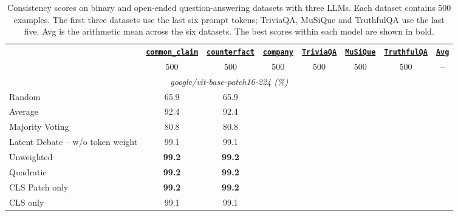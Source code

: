 \begin{table}[tp]
    \centering
    \tiny
    \setlength{\tabcolsep}{2.2mm}
    \begin{threeparttable}
        \begin{tabular}{lccccccc}
            \toprule
            & \textbf{\underline{\texttt{common\_claim}}} & \textbf{\underline{\texttt{counterfact}}} & \textbf{\underline{\texttt{company}}} & \textbf{\underline{\texttt{TriviaQA}}} & \textbf{\underline{\texttt{MuSiQue}}} & \textbf{\underline{\texttt{TruthfulQA}}} & \textbf{\underline{\texttt{Avg}}} \\
            & 500 & 500 & 500 & 500 & 500 & 500 & -- \\
            \midrule
            \multicolumn{8}{c}{\textit{google/vit-base-patch16-224 (\%)}} \\
            \midrule
            Random & 65.9 & 65.9 \\
            Average & 92.4 & 92.4 \\
            Majority Voting & 80.8 & 80.8 \\
            Latent Debate -- w/o token weight & 99.1 & 99.1 \\
            Unweighted & \textbf{99.2} & \textbf{99.2} \\
            Quadratic & \textbf{99.2} & \textbf{99.2} \\
            CLS Patch only & \textbf{99.2} & \textbf{99.2} \\
            CLS only & 99.1 & 99.1 \\
            \bottomrule
        \end{tabular}
        \caption{Consistency scores on binary and open-ended question-answering datasets with three LLMs. Each dataset contains 500 examples. The first three datasets use the last six prompt tokens; TriviaQA, MuSiQue and TruthfulQA use the last five. Avg is the arithmetic mean across the six datasets. The best scores within each model are shown in bold.}
        \label{tab:correlation}
    \end{threeparttable}
    \vspace{-10pt}
\end{table}
